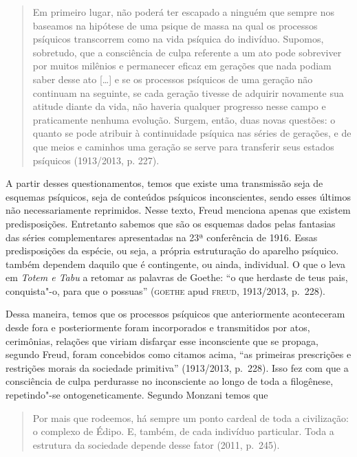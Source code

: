 \begin{quote}
Em primeiro lugar, não poderá ter escapado a ninguém que sempre nos
baseamos na hipótese de uma psique de massa na qual os processos
psíquicos transcorrem como na vida psíquica do indivíduo. Supomos,
sobretudo, que a consciência de culpa referente a um ato pode sobreviver
por muitos milênios e permanecer eficaz em gerações que nada podiam
saber desse ato {[}\ldots{}{]} e se os processos psíquicos de uma geração não
continuam na seguinte, se cada geração tivesse de adquirir novamente sua
atitude diante da vida, não haveria qualquer progresso nesse campo e
praticamente nenhuma evolução. Surgem, então, duas novas questões: o
quanto se pode atribuir à continuidade psíquica nas séries de gerações,
e de que meios e caminhos uma geração se serve para transferir seus
estados psíquicos (1913/2013, p. 227).
\end{quote}

A partir desses questionamentos, temos que existe uma transmissão seja
de esquemas psíquicos, seja de conteúdos psíquicos inconscientes, sendo
esses últimos não necessariamente reprimidos. Nesse texto, Freud
menciona apenas que existem predisposições. Entretanto sabemos que são
os esquemas dados pelas fantasias das séries complementares apresentadas
na 23ª conferência de 1916. Essas predisposições da espécie, ou seja, a
própria estruturação do aparelho psíquico. também dependem daquilo que é
contingente, ou ainda, individual. O que o leva em \emph{Totem e Tabu} a
retomar as palavras de Goethe: ``o que herdaste de teus pais,
conquista"-o, para que o possuas'' (\textsc{goethe} apud \textsc{freud}, 1913/2013, p.~228).

Dessa maneira, temos que os processos psíquicos que anteriormente
aconteceram desde fora e posteriormente foram incorporados e
transmitidos por atos, cerimônias, relações que viriam disfarçar esse
inconsciente que se propaga, segundo Freud, foram concebidos como
citamos acima, ``as primeiras prescrições e restrições morais da
sociedade primitiva'' (1913/2013, p.~228). Isso fez com que a
consciência de culpa perdurasse no inconsciente ao longo de toda a
filogênese, repetindo"-se ontogeneticamente. Segundo Monzani temos que

\begin{quote}
Por mais que rodeemos, há sempre um ponto cardeal de toda a civilização:
o complexo de Édipo. E, também, de cada indivíduo particular. Toda a
estrutura da sociedade depende desse fator (2011, p.~245).
\end{quote}

